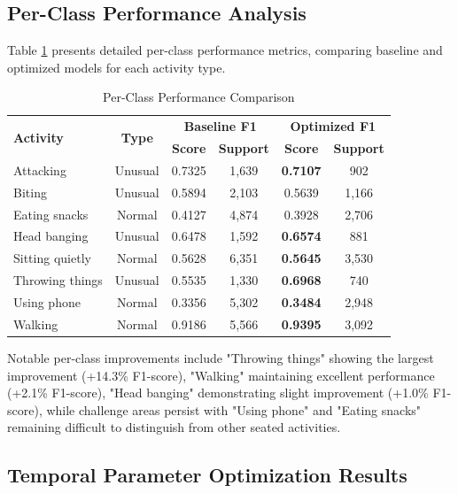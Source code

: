 \documentclass{iopconfser}
\begin{document}
\subsection{Per-Class Performance Analysis}

Table \ref{tab:class_performance} presents detailed per-class performance metrics, comparing baseline and optimized models for each activity type.

\begin{table}[H]
\centering
\caption{Per-Class Performance Comparison}
\label{tab:class_performance}
\small
\begin{tabular}{lccccc}
\toprule
\multirow{2}{*}{\textbf{Activity}} & \multirow{2}{*}{\textbf{Type}} & \multicolumn{2}{c}{\textbf{Baseline F1}} & \multicolumn{2}{c}{\textbf{Optimized F1}} \\
\cmidrule(lr){3-4} \cmidrule(lr){5-6}
& & \textbf{Score} & \textbf{Support} & \textbf{Score} & \textbf{Support} \\
\midrule
Attacking & Unusual & 0.7325 & 1,639 & \textbf{0.7107} & 902 \\
Biting & Unusual & 0.5894 & 2,103 & 0.5639 & 1,166 \\
Eating snacks & Normal & 0.4127 & 4,874 & 0.3928 & 2,706 \\
Head banging & Unusual & 0.6478 & 1,592 & \textbf{0.6574} & 881 \\
Sitting quietly & Normal & 0.5628 & 6,351 & \textbf{0.5645} & 3,530 \\
Throwing things & Unusual & 0.5535 & 1,330 & \textbf{0.6968} & 740 \\
Using phone & Normal & 0.3356 & 5,302 & \textbf{0.3484} & 2,948 \\
Walking & Normal & 0.9186 & 5,566 & \textbf{0.9395} & 3,092 \\
\bottomrule
\end{tabular}
\end{table}

Notable per-class improvements include "Throwing things" showing the largest improvement (+14.3\% F1-score), "Walking" maintaining excellent performance (+2.1\% F1-score), "Head banging" demonstrating slight improvement (+1.0\% F1-score), while challenge areas persist with "Using phone" and "Eating snacks" remaining difficult to distinguish from other seated activities.

\subsection{Temporal Parameter Optimization Results}
\end{document}
